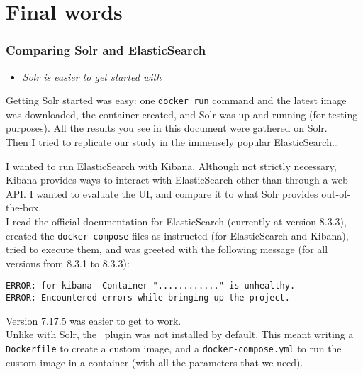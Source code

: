 
\renewcommand{\currentPart}{Final words}
\part{\currentPart} \label{part - Final words}


\section{Comparing Solr and ElasticSearch}


\begin{itemize}
	\item \emph{Solr is easier to get started with}
\end{itemize}

Getting Solr started was easy: one \texttt{docker run} command and the latest image was downloaded, the container created, and Solr was up and running (for testing purposes). All the results you see in this document were gathered on Solr. \\ 

Then I tried to replicate our study in the immensely popular ElasticSearch\dots \\


\bigskip
	
I wanted to run ElasticSearch with Kibana. Although not strictly necessary, Kibana provides ways to interact with ElasticSearch other than through a web API. I wanted to evaluate the UI, and compare it to what Solr provides out-of-the-box. \\

I read the official documentation for ElasticSearch (currently at version 8.3.3), created the \texttt{docker-compose} files as instructed (for ElasticSearch and Kibana), tried to execute them, and was greeted with the following message (for all versions from 8.3.1 to 8.3.3):
\begin{lstlisting}
ERROR: for kibana  Container "............" is unhealthy.
ERROR: Encountered errors while bringing up the project.
\end{lstlisting}


\bigskip

Version 7.17.5 was easier to get to work. \\

Unlike with Solr, the \kuromoji\ plugin was not installed by default. This meant writing a \texttt{Dockerfile} to create a custom image, and a \texttt{docker-compose.yml} to run the custom image in a container (with all the parameters that we need). \\

